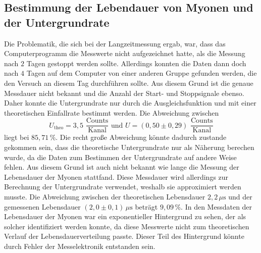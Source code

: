 \subsection{Bestimmung der Lebendauer von Myonen und der Untergrundrate}
Die Problematik, die sich bei der Langzeitmessung ergab, war, dass das Computerprogramm die Messwerte nicht aufgezeichnet hatte, als
die Messung nach $2$ Tagen gestoppt werden sollte. Allerdings konnten die Daten dann doch nach $4$ Tagen auf dem Computer von einer 
anderen Gruppe gefunden werden, die den Versuch an diesem Tag durchführen sollte. Aus diesem Grund ist die genaue Messdauer nicht
bekannt und die Anzahl der Start- und Stoppsignale ebenso. Daher konnte die Untergrundrate nur durch die Ausgleichsfunktion und 
mit einer theoretischen Einfallrate bestimmt werden. Die Abweichung zwischen 
$$U_{\text{theo}} = 3,5 \,\, \frac{\text{Counts}}{\text{Kanal}}\,\, \text{und} \,\, U = (0,50 \pm 0,29) \,\, \frac{\text{Counts}}{\text{Kanal}}$$
liegt bei $85,71 \, \%$. Die recht große Abweichung könnte dadurch zustande gekommen sein, dass die theoretische Untergrundrate 
nur als Näherung berechen wurde, da die Daten zum Bestimmen der Untergrundrate auf andere Weise fehlen. Aus diesem Grund ist auch nicht bekannt wie lange die Messung der Lebensdauer der Myonen stattfand. Diese Messdauer wird allerdings zur Berechnung der Untergrundrate verwendet, weshalb sie approximiert werden musste. 
Die Abweichung zwischen der theoretischen Lebensdauer $2,2 \, \unit{\mu\second}$ und der gemessenen Lebensdauer 
$(2,0 \pm 0,1)\, \unit{\mu\second}$ beträgt $9,09 \, \%$. In den Messdaten der Lebensdauer der Myonen war ein exponentieller Hintergrund zu sehen, der als solcher identifiziert werden konnte, da diese Messwerte nicht zum theoretischen Verlauf der Lebensdauerverteilung passte. Dieser Teil des Hintergrund könnte durch Fehler der Messelektronik entstanden sein.

